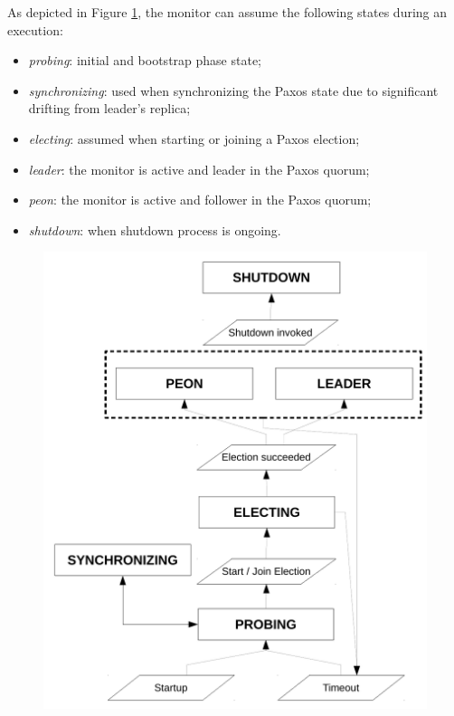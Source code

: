 \documentclass{article}
\begin{document}
As depicted in Figure \ref{fig:monstate}, the monitor can assume the following states during an execution:
\begin{itemize} %
\item \textit{probing}: initial and bootstrap phase state;
\item \textit{synchronizing}: used when synchronizing the Paxos state due to significant drifting from leader's replica;
\item \textit{electing}: assumed when starting or joining a Paxos election;
\item \textit{leader}: the monitor is active and leader in the Paxos quorum; 
\item \textit{peon}: the monitor is active and follower in the Paxos quorum;
\item \textit{shutdown}: when shutdown process is ongoing.
\end{itemize}

\begin{figure}[!h]
    \centering
	\includegraphics[scale=0.50]{figs/monitor_states.pdf}
	\label{fig:monstate}
\end{figure}
\FloatBarrier
\end{document}
